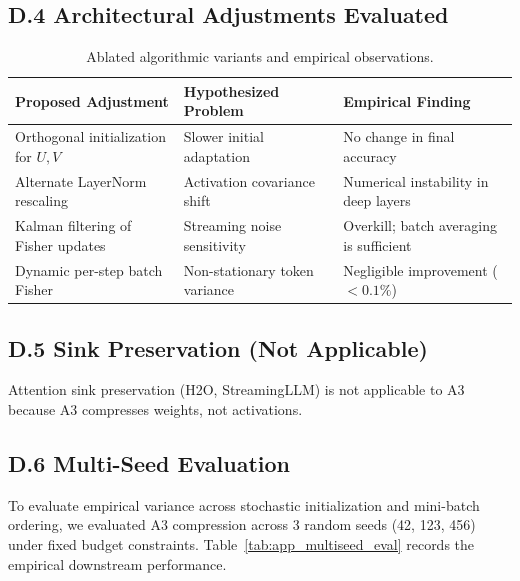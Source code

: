 \subsection{D.4 Architectural Adjustments Evaluated}

\begin{table}[H]
\centering
\small
\begin{tabular}{lll}
\toprule
\textbf{Proposed Adjustment} & \textbf{Hypothesized Problem} & \textbf{Empirical Finding} \\
\midrule
Orthogonal initialization for $U, V$ & Slower initial adaptation & No change in final accuracy \\
Alternate LayerNorm rescaling & Activation covariance shift & Numerical instability in deep layers \\
Kalman filtering of Fisher updates & Streaming noise sensitivity & Overkill; batch averaging is sufficient \\
Dynamic per-step batch Fisher & Non-stationary token variance & Negligible improvement ($<0.1\%$) \\
\bottomrule
\end{tabular}
\caption{Ablated algorithmic variants and empirical observations.}
\label{tab:negative_variants}
\end{table}

\subsection{D.5 Sink Preservation (Not Applicable)}

Attention sink preservation (H2O, StreamingLLM) is not applicable to A3 
because A3 compresses weights, not activations.

\subsection{D.6 Multi-Seed Evaluation}
\label{sec:app_multiseed}

To evaluate empirical variance across stochastic initialization and mini-batch ordering, we evaluated A3 compression across 3 random seeds (42, 123, 456) under fixed budget constraints. Table~\ref{tab:app_multiseed_eval} records the empirical downstream performance.

